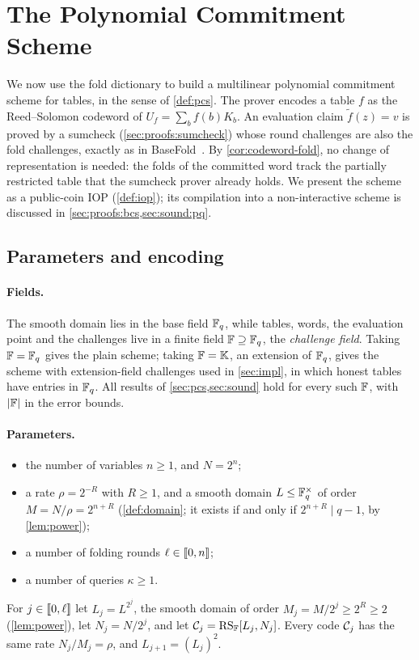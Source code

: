 \section{The Polynomial Commitment Scheme}\label{sec:pcs}

We now use the fold dictionary to build a multilinear polynomial commitment scheme for tables, in the sense of \cref{def:pcs}.
The prover encodes a table $f$ as the Reed--Solomon codeword of $U_f = \sum_b f(b) K_b$.
An evaluation claim $\tilde f(z) = v$ is proved by a sumcheck (\cref{sec:proofs:sumcheck}) whose round challenges are also the fold challenges, exactly as in BaseFold~\cite{ZCF24}.
By \cref{cor:codeword-fold}, no change of representation is needed: the folds of the committed word track the partially restricted table that the sumcheck prover already holds.
We present the scheme as a public-coin IOP (\cref{def:iop}); its compilation into a non-interactive scheme is discussed in \cref{sec:proofs:bcs,sec:sound:pq}.

\subsection{Parameters and encoding}\label{sec:pcs:params}

\paragraph{Fields.}
The smooth domain lies in the base field $\mathbb{F}_q$, while tables, words, the evaluation point and the challenges live in a finite field $\mathbb{F} \supseteq \mathbb{F}_q$, the \emph{challenge field}.
Taking $\mathbb{F} = \mathbb{F}_q$ gives the plain scheme; taking $\mathbb{F} = \mathbb{K}$, an extension of $\mathbb{F}_q$, gives the scheme with extension-field challenges used in \cref{sec:impl}, in which honest tables have entries in $\mathbb{F}_q$.
All results of \cref{sec:pcs,sec:sound} hold for every such $\mathbb{F}$, with $|\mathbb{F}|$ in the error bounds.

\paragraph{Parameters.}
\begin{itemize}
  \item the number of variables $n \ge 1$, and $N = 2^n$;
  \item a rate $\rho = 2^{-R}$ with $R \ge 1$, and a smooth domain $L \le \mathbb{F}_q^\times$ of order $M = N/\rho = 2^{n+R}$ (\cref{def:domain}; it exists if and only if $2^{n+R} \mid q-1$, by \cref{lem:power});
  \item a number of folding rounds $\ell \in \llbracket 0, n \rrbracket$;
  \item a number of queries $\kappa \ge 1$.
\end{itemize}
For $j \in \llbracket 0, \ell \rrbracket$ let $L_j = L^{2^j}$, the smooth domain of order $M_j = M/2^j \ge 2^R \ge 2$ (\cref{lem:power}), let $N_j = N/2^j$, and let $\mathcal{C}_j = \mathrm{RS}_{\mathbb{F}}[L_j, N_j]$.
Every code $\mathcal{C}_j$ has the same rate $N_j/M_j = \rho$, and $L_{j+1} = (L_j)^2$.


